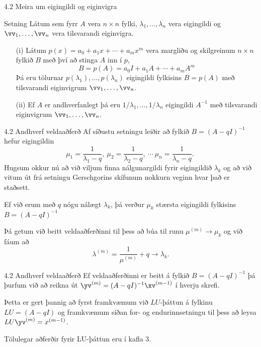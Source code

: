 \begin{frame}{4.2 Meira um eigingildi og eiginvigra} 
\begin{block}{Setning} 
Látum sem fyrr $A$ vera $n\times n$ fylki, $\lambda_1,\dots,\lambda_n$
vera eigingildi og $\vv_1,\dots,\vv_n$ vera  tilsvarandi eiginvigra.
\begin{enumerate}
\item [(i)] Látum 
$p(x)=a_0+a_1x+\cdots+a_mx^m$ vera margliðu og skilgreinum $n\times n$
fylkið $B$ með því að stinga $A$ inn í $p$,
$$
B=p(A)=a_0I+a_1A+\cdots+a_mA^m
$$
Þá eru tölurnar $p(\lambda_1),\dots,p(\lambda_n)$ eigingildi fylkisins
$B=p(A)$ með tilsvarandi eiginvigrum $\vv_1,\dots,\vv_n$.
\item [(ii)] Ef $A$ er andhverfanlegt þá eru
$1/\lambda_1,\dots,1/\lambda_n$ eigingildi $A^{-1}$ 
með tilsvarandi eiginvigrum $\vv_1,\dots,\vv_n$.
\end{enumerate}
\end{block}
\end{frame}

\begin{frame}{4.2 Andhverf veldaaðferð} 
Af síðustu setningu leiðir að fylkið $B=(A-qI)^{-1}$ hefur eigingildin
$$
\mu_1=\dfrac 1{\lambda_1-q},\ 
\mu_2=\dfrac 1{\lambda_2-q},\ \cdots \  
\mu_n=\dfrac 1{\lambda_n-q}.\ 
$$
Hugsum okkur nú að við viljum finna nálgunargildi fyrir 
eigingildið $\lambda_k$ og að við vitum út frá setningu Gerschgorins 
skífunum nokkurn veginn hvar það er staðsett.  

\pause
\smallskip
Ef við erum með $q$
nógu nálægt $\lambda_k$, þá verður $\mu_k$ stærsta eigingildi
fylkisins $B=(A-qI)^{-1}$

\pause
\smallskip
Þá getum við beitt veldaaðferðinni til þess að búa til runu 
$\mu^{(m)}\to \mu_k$ og við fáum að
$$
\lambda^{(m)}=\dfrac 1{\mu^{(m)}}+q\to \lambda_k. 
$$
\end{frame}

\begin{frame}{4.2 Andhverf veldaaðferð} 
Ef veldaaðferðinni er beitt á fylkið $B=(A-qI)^{-1}$ þá þurfum við að 
reikna út $\yv^{(m)}=(A-qI)^{-1}\xv^{(m-1)}$ í hverju skrefi.

\pause
\smallskip
Þetta er gert þannig að fyrst framkvæmum við $LU$-þáttun á 
fylkinu $LU=(A-qI)$ og framkvæmum síðan for- og endurinnsetningu
til þess að leysa $LU\yv^{(m)}=x^{(m-1)}$. 

\pause
\smallskip
Tölulegar aðferðir fyrir LU-þáttun eru í kafla 3.
\end{frame}

